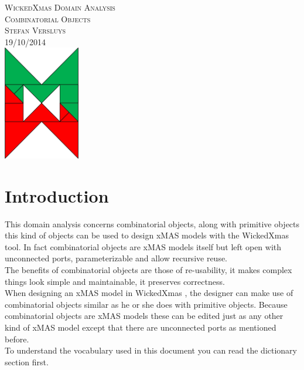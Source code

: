 \documentclass[a4paper,11pt,final]{article}
\begin{document}

\begin{titlepage}
	\vspace*{\fill}
    \begin{center}
    	\textsc{\large WickedXmas Domain Analysis}\\[0.5cm]
    	\textsc{\huge Combinatorial Objects}\\[0.5cm]
		\textsc{Stefan Versluys}\\
		\textsc{\scriptsize 19/10/2014}\\[2.0cm]
		\includegraphics[width=0.25\textwidth]{wXm}
	\end{center}
	\vspace*{\fill}
\end{titlepage}


\tableofcontents
\newpage


\section{Introduction}
This domain analysis concerns combinatorial objects, along with primitive objects this kind of objects can be used to design xMAS models with the WickedXmas tool. In fact combinatorial objects are xMAS models itself but left open with unconnected ports, parameterizable and allow recursive reuse.\\
The benefits of combinatorial objects are those of re-usability, it makes complex things look simple and maintainable, it preserves correctness.\\
When designing an xMAS model in WickedXmas , the designer can make use of combinatorial objects similar as he or she does with primitive objects. Because combinatorial objects are xMAS models these can be edited just as any other kind of xMAS model except that there are unconnected ports as mentioned before.
\\To understand the vocabulary used in this document you can read the dictionary section first.
\end{document}
